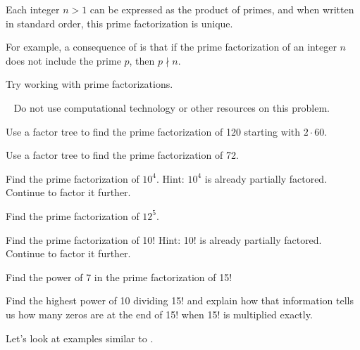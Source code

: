 \begin{thm}
\label{thm_FTOArith} Each integer $n >1$ can be expressed as the product of primes, and when written in standard order, this prime factorization is unique.   
\end{thm}

For example, a consequence of  is that if the prime factorization of an integer $n$ does not include the prime $p$, then $p \nmid n$.

Try working with prime factorizations.

\begin{act}
\label{act_prime_fact}  
~
    Do not use computational technology or other resources on this problem.
    \begin{actpart}
        \item Use a factor tree to find the prime factorization of 120 starting with $2 \cdot 60$.
        \item Use a factor tree to find the prime factorization of 72.
        \item Find the prime factorization of $10^4$.  Hint: $10^4$ is already partially factored. Continue to factor it further.
        \item Find the prime factorization of $12^5$.  
        \item Find the prime factorization of 10!  Hint: 10! is already partially factored.  Continue to factor it further.
        \item Find the power of 7 in the prime factorization of 15!
        \item Find the highest power of 10 dividing 15! and explain how that information tells us how many zeros are at the end of 15! when 15! is multiplied exactly.  
    \end{actpart}
\end{act}

Let's look at examples similar to .

